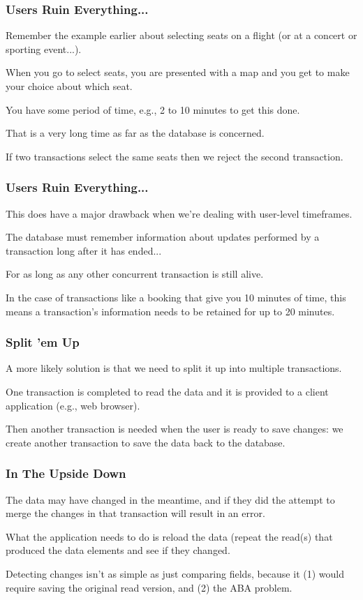 \begin{frame}
\frametitle{Users Ruin Everything...}

Remember the example earlier about selecting seats on a flight (or at a concert or sporting event...). 

When you go to select seats, you are presented with a map and you get to make your choice about which seat. 

You have some period of time, e.g., 2 to 10 minutes to get this done. 

That is a very long time as far as the database is concerned. 

If two transactions select the same seats then we reject the second transaction.

\end{frame}


\begin{frame}
\frametitle{Users Ruin Everything...}

This does have a major drawback when we're dealing with user-level timeframes. 

The database must remember information about updates performed by a transaction long after it has ended... 

For as long as any other concurrent transaction is still alive.

In the case of transactions like a booking that give you 10 minutes of time, this means a transaction's information needs to be retained for up to 20 minutes. 


\end{frame}

\begin{frame}
\frametitle{Split 'em Up}

A more likely solution is that we need to split it up into multiple transactions. 

One transaction is completed to read the data and it is provided to a client application (e.g., web browser). 

Then another transaction is needed when the user is ready to save changes: we create another transaction to save the data back to the database. 


\end{frame}

\begin{frame}
\frametitle{In The Upside Down}

The data may have changed in the meantime, and if they did the attempt to merge the changes in that transaction will result in an error. 

What the application needs to do is reload the data (repeat the read(s) that produced the data elements and see if they changed. 

Detecting changes isn't as simple as just comparing fields, because it (1) would require saving the original read version, and (2) the ABA problem.

\end{frame}

